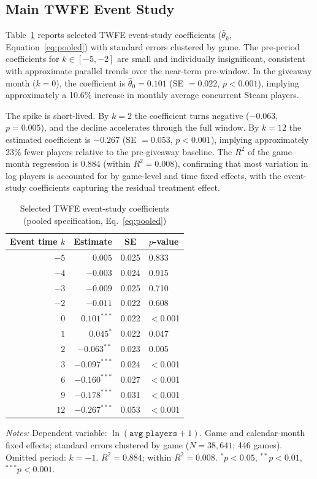\documentclass[11pt]{article}
\begin{document}
\subsection{Main TWFE Event Study}

Table~\ref{tab:coefs} reports selected TWFE event-study coefficients
($\hat{\theta}_k$, Equation~\eqref{eq:pooled}) with standard errors clustered
by game. The pre-period coefficients for $k \in [-5, -2]$ are small and
individually insignificant, consistent with approximate parallel trends over
the near-term pre-window. In the giveaway month ($k = 0$), the coefficient
is $\hat{\theta}_0 = 0.101$ (SE $= 0.022$, $p < 0.001$), implying
approximately a 10.6\% increase in monthly average concurrent Steam players.

The spike is short-lived. By $k = 2$ the coefficient turns negative
($-0.063$, $p = 0.005$), and the decline accelerates through the full window.
By $k = 12$ the estimated coefficient is $-0.267$ (SE $= 0.053$,
$p < 0.001$), implying approximately 23\% fewer players relative to the
pre-giveaway baseline. The $R^2$ of the game--month regression is 0.884
(within $R^2 = 0.008$), confirming that most variation in log players is
accounted for by game-level and time fixed effects, with the event-study
coefficients capturing the residual treatment effect.

\begin{table}[H]
\centering\small
\caption{Selected TWFE event-study coefficients (pooled specification,
  Eq.~\eqref{eq:pooled})}
\label{tab:coefs}
\begin{tabular}{rrcl}
\toprule
Event time $k$ & Estimate & SE & $p$-value \\
\midrule
$-5$ &  $\phantom{-}0.005$ & 0.025 & 0.833 \\
$-4$ &  $-0.003$ & 0.024 & 0.915 \\
$-3$ &  $-0.009$ & 0.025 & 0.710 \\
$-2$ &  $-0.011$ & 0.022 & 0.608 \\
\midrule
$\phantom{-}0$ & $\mathbf{0.101}^{***}$ & 0.022 & $<$0.001 \\
$\phantom{-}1$ & $0.045^{*}$ & 0.022 & 0.047 \\
$\phantom{-}2$ & $-0.063^{**}$ & 0.023 & 0.005 \\
$\phantom{-}3$ & $-0.097^{***}$ & 0.024 & $<$0.001 \\
$\phantom{-}6$ & $-0.160^{***}$ & 0.027 & $<$0.001 \\
$\phantom{-}9$ & $-0.178^{***}$ & 0.031 & $<$0.001 \\
$12$ & $-0.267^{***}$ & 0.053 & $<$0.001 \\
\bottomrule
\end{tabular}
\medskip

\noindent\small\textit{Notes:} Dependent variable: $\ln(\texttt{avg\_players}+1)$.
  Game and calendar-month fixed effects;
  standard errors clustered by game ($N = 38{,}641$; 446 games).
  Omitted period: $k = -1$. $R^2 = 0.884$; within $R^2 = 0.008$.
  $^{*}p<0.05$, $^{**}p<0.01$, $^{***}p<0.001$.
\end{table}
\end{document}
